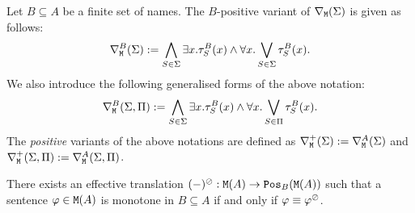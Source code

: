 \begin{definition}\label{def:monbasicformofoe}
Let $B\subseteq A$ be a finite set of names. 
The $B$-positive variant of $\dbnfofo{\Sigma}$ is given as follows:
\[
\mondbnfofo{\Sigma}{B} \isdef  
\bigwedge_{S\in\Sigma} \exists x. \tau^{B}_S(x) \land 
  \forall x. \bigvee_{S\in\Sigma} \tau^{B}_S(x).
\]
We also introduce the following generalised forms of the above notation:
\[
\mondgbnfofo{\Sigma}{\Pi}{B} \isdef  
\bigwedge_{S\in\Sigma} \exists x. \tau^{B}_S(x) \land 
  \forall x. \bigvee_{S\in\Pi} \tau^{B}_S(x).
\]
The \emph{positive} variants of the above notations are defined as 
$\posdbnfofo{\Sigma} \isdef  \mondbnfofo{\Sigma}{A}$ and 
$\posdgbnfofo{\Sigma}{\Pi} \isdef  \mondgbnfofo{\Sigma}{\Pi}{A}$.
\end{definition}


\begin{proposition}
\label{p:fomon}
There exists an effective translation $(-)^\tmono:\ofo(A) \to \monot{\ofo(A)}{B}$ such that
a sentence ${\phi \in \ofo(A)}$ is monotone in $B\subseteq A$ if and only if 
$\phi\equiv \phi^\tmono$.
\end{proposition}
%
